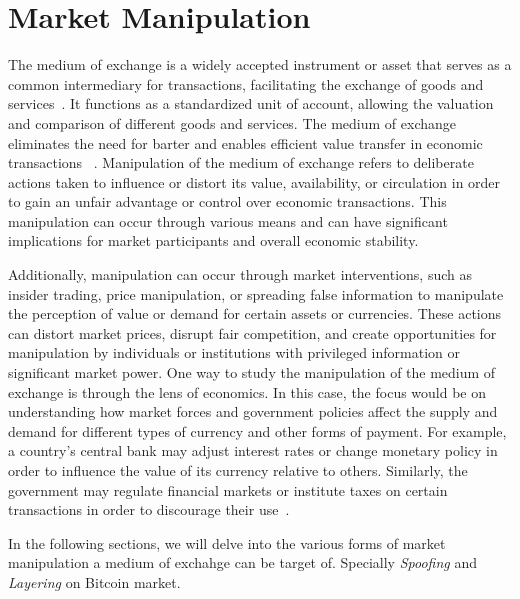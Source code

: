 \section{Market Manipulation}
The medium of exchange is a widely accepted instrument or asset that serves as a common intermediary for transactions, facilitating the exchange of
goods and services~\cite{mankiw2014principles}. It functions as a standardized unit of account, allowing the valuation and comparison of different
goods and services. The medium of exchange eliminates the need for barter and enables efficient value transfer in economic transactions
~\cite{friedman2004money}. Manipulation of the medium of exchange refers to deliberate actions taken to influence or distort its value, availability,
or circulation in order to gain an unfair advantage or control over economic transactions. This manipulation can occur through various means and can
have significant implications for market participants and overall economic stability.

Additionally, manipulation can occur through market interventions, such as insider trading, price manipulation, or spreading false information to
manipulate the perception of value or demand for certain assets or currencies. These actions can distort market prices, disrupt fair competition,
and create opportunities for manipulation by individuals or institutions with privileged information or significant market power. One way
to study the manipulation of the medium of exchange is through the lens of economics. In this case, the focus would be on understanding how market
forces and government policies affect the supply and demand for different types of currency and other forms of payment. For example, a country's
central bank may adjust interest rates or change monetary policy in order to influence the value of its currency relative to others. Similarly,
the government may regulate financial markets or institute taxes on certain transactions in order to discourage their use~\cite{domanski2011currency}.

In the following sections, we will delve into the various forms of market manipulation a medium of exchahge can be target of. Specially \emph{Spoofing}
and \emph{Layering} on Bitcoin market.




